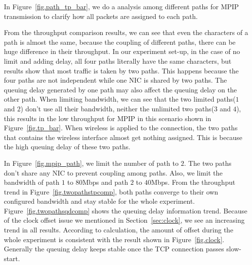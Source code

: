 In Figure~\ref{fig.path_tp_bar}, we do a analysis among different paths for MPIP transmission to clarify how all packets are assigned to each path.

From the throughput comparison results, we can see that even the characters of a path is almost the same, because the coupling of different paths, there can be huge difference in their throughput. In our experiment set-up, in the case of no limit and adding delay, all four paths literally have the same characters, but results show that most traffic is taken by two paths. This happens because the four paths are not independent while one NIC is shared by two paths. The queuing delay generated by one path may also affect the queuing delay on the other path. When limiting bandwidth, we can see that the two limited paths($1$ and $2$) don't use all their bandwidth, neither the unlimited two paths($3$ and $4$), this results in the low throughput for MPIP in this scenario shown in Figure~\ref{fig.tp_bar}. When wireless is applied to the connection, the two paths that contains the wireless interface almost get nothing assigned. This is because the high queuing delay of these two paths.

In Figure~\ref{fig.mpip_path}, we limit the number of path to $2$. The two paths don't share any NIC to prevent coupling among paths. Also, we limit the bandwidth of path $1$ to $80$Mbps and path $2$ to $40$Mbps. From the throughput trend in Figure~\ref{fig.twopathstpcomp}, both paths converge to their own configured bandwidth and stay stable for the whole experiment. Figure~\ref{fig.twopathsqdcomp} shows the queuing delay information trend. Because of the clock offset issue we mentioned in Section~\ref{sec:clock}, we see an increasing trend in all results. According to calculation, the amount of offset during the whole experiment is consistent with the result shown in Figure~\ref{fig.clock}. Generally the queuing delay keeps stable once the TCP connection passes slow-start.


